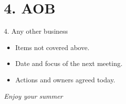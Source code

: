 \documentclass[10pt,aspectratio=169]{beamer}
\begin{document}
\section{4. AOB}
\begin{frame}{4. Any other business}
  \begin{itemize}
    \item Items not covered above.
    \item Date and focus of the next meeting.
    \item Actions and owners agreed today.
  \end{itemize}
  \vfill
  \begin{center}\emph{Enjoy your summer}\end{center}
\end{frame}
\end{document}
